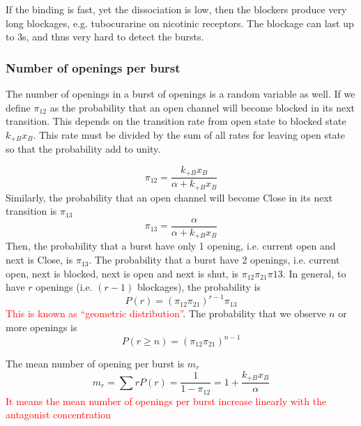 If the binding is fast, yet the dissociation is low, then the blockers
produce very long blockages, e.g. tubocurarine on nicotinic
receptors. The blockage can last up to 3s, and thus very hard to
detect the bursts.

\subsubsection{Number of openings per burst}
\label{sec:number-openings-per}

The number of openings in a burst of openings is a random variable as
well. If we define $\pi_{12}$ as the probability that an open channel
will become blocked in its next transition. This depends on the
transition rate from open state to blocked state $k_{+B}x_B$. This
rate must be divided by the sum of all rates for leaving open state so
that the probability add to unity.

\begin{equation}
  \label{eq:837}
  \pi_{12} = \frac{k_{+B}x_B}{\alpha+k_{+B}x_B}
\end{equation}
Similarly, the probability that an open channel will become Close in
its next transition is $\pi_{13}$
\begin{equation}
  \label{eq:906}
  \pi_{13} = \frac{\alpha}{\alpha+k_{+B}x_B}
\end{equation}
Then, the probability that a burst have only 1 opening, i.e. current
open and next is Close, is $\pi_{13}$. The probability that a burst
have 2 openings, i.e. current open, next is blocked, next is open and
next is shut, is $\pi_{12}\pi_{21}\pi{13}$. In general, to have $r$
openings (i.e.  $(r-1)$ blockages), the probability is
\begin{equation}
  \label{eq:907}
  P(r) = \left(\pi_{12}\pi_{21}\right)^{r-1} \pi_{13}
\end{equation}
\textcolor{red}{This is known as ``geometric distribution''}. The
probability that we observe $n$ or more openings is
\begin{equation}
  \label{eq:908}
  P(r\ge n) = (\pi_{12}\pi_{21})^{n-1}
\end{equation}


The mean number of opening per burst is $m_r$
\begin{equation}
  \label{eq:909}
  m_r = \sum rP(r) = \frac{1}{1-\pi_{12}} = 1 + \frac{k_{+B}x_B}{\alpha}
\end{equation}
\textcolor{red}{It means the mean number of openings per burst
  increase linearly with the antagonist concentration}


